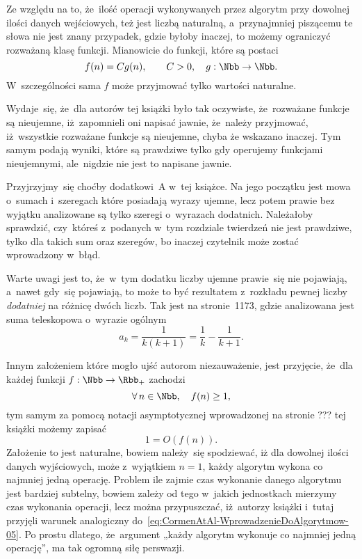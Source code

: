 \documentclass[a4paper,11pt]{article}
\numberwithin{equation}{section}
\begin{document}
Ze względu na to, że~ilość operacji wykonywanych przez algorytm przy
dowolnej ilości danych wejściowych, też jest liczbą naturalną,
a~przynajmniej piszącemu te słowa nie jest znany
przypadek, gdzie byłoby inaczej, to możemy ograniczyć rozważaną klasę
funkcji. Mianowicie do funkcji, które są postaci
\begin{equation}
  \label{eq:CormenAtAl-WprowadzenieDoAlgorytmow-03}
  f( n ) = C g( n ), \qquad
  C > 0, \quad
  g : \Nbb \to \Nbb.
\end{equation}
W~szczególności sama $f$ może przyjmować tylko wartości naturalne.

Wydaje~się, że~dla autorów tej książki było tak oczywiste, że~rozważane
funkcje są nieujemne, iż~zapomnieli oni napisać jawnie, że~należy przyjmować,
iż~wszystkie rozważane funkcje są nieujemne, chyba że wskazano inaczej. Tym
samym podają wyniki, które są prawdziwe tylko gdy operujemy funkcjami
nieujemnymi, ale~nigdzie nie jest to napisane jawnie.

Przyjrzyjmy~się choćby dodatkowi~A w~tej książce. Na jego początku jest mowa
o~sumach i~szeregach które posiadają wyrazy ujemne, lecz potem prawie bez
wyjątku analizowane są tylko szeregi o~wyrazach dodatnich. Należałoby
sprawdzić, czy~któreś z~podanych w~tym rozdziale twierdzeń nie jest
prawdziwe, tylko dla takich sum oraz szeregów, bo inaczej czytelnik może
zostać wprowadzony w~błąd.

Warte uwagi jest to, że~w~tym dodatku liczby ujemne prawie~się nie
pojawiają, a~nawet gdy~się pojawiają, to może to być rezultatem z~rozkładu
pewnej liczby \textit{dodatniej} na różnicę dwóch liczb. Tak jest na
stronie~1173, gdzie analizowana jest suma teleskopowa o~wyrazie ogólnym
\begin{equation}
  \label{eq:CormenAtAl-WprowadzenieDoAlgorytmow-04}
  a_{ k } = \frac{ 1 }{ k ( k + 1 ) } =
  \frac{ 1 }{ k } - \frac{ 1 }{ k + 1 }.
\end{equation}

Innym założeniem które mogło ujść autorom niezauważenie, jest przyjęcie,
że~dla każdej funkcji $f : \Nbb \to \Rbb_{ + }$ zachodzi
\begin{equation}
  \label{eq:CormenAtAl-WprowadzenieDoAlgorytmow-05}
  \forall \, n \in \Nbb, \quad
  f( n ) \geq 1,
\end{equation}
tym samym za pomocą notacji asymptotycznej wprowadzonej na stronie ??? tej
książki możemy zapisać
\begin{equation}
  \label{eq:CormenAtAl-WprowadzenieDoAlgorytmow-06}
  1 = O\left( f( n ) \right).
\end{equation}
Założenie to jest naturalne, bowiem należy~się spodziewać, iż dla dowolnej
ilości danych wyjściowych, może z~wyjątkiem $n = 1$, każdy algorytm wykona
co najmniej jedną operację. Problem ile zajmie czas wykonanie danego
algorytmu jest bardziej subtelny, bowiem zależy od tego w~jakich jednostkach
mierzymy czas wykonania operacji, lecz można przypuszczać, iż~autorzy
książki i~tutaj przyjęli warunek analogiczny
do~\eqref{eq:CormenAtAl-WprowadzenieDoAlgorytmow-05}. Po prostu dlatego,
że~argument „każdy algorytm wykonuje co najmniej jedną operację”, ma tak
ogromną siłę perswazji.
\end{document}
